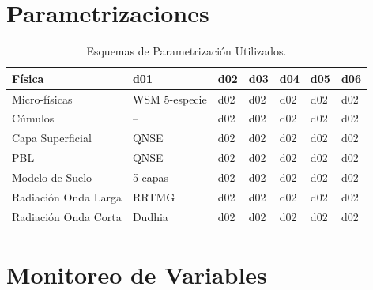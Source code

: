 \section{Parametrizaciones}
\begin{table}[h!]
	\caption{Esquemas de Parametrización Utilizados.}\label{tab:esquemas}
	\centering
	\begin{tabular}{lllllll}
		\toprule
		Física 					& d01	&	d02	&	d03	&	d04	&	d05	&	d06 \\
		\midrule
		Micro-físicas		 	& WSM 5-especie&d02&d02&d02&d02&d02  \\
		Cúmulos			 		& -- &d02&d02&d02&d02&d02\\ 
		Capa Superficial	 	& QNSE &d02&d02&d02&d02&d02\\
		PBL				 		& QNSE &d02&d02&d02&d02&d02\\
		Modelo de Suelo 		& 5 capas&d02&d02&d02&d02&d02 	\\
		Radiación Onda Larga	& RRTMG&d02&d02&d02&d02&d02 \\
		Radiación Onda Corta	& Dudhia&d02&d02&d02&d02&d02 \\
		\bottomrule
	\end{tabular}
\end{table}
\section{Monitoreo de Variables}